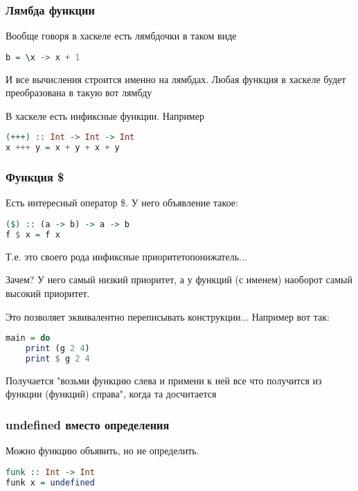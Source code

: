 \documentclass[10pt, a4paper]{article}
\begin{document}
\subsubsection{Лямбда функции}
Вообще говоря в хаскеле есть лямбдочки в таком виде

\begin{lstlisting}[language=haskell]
b = \x -> x + 1
\end{lstlisting}

И все вычисления строится именно на лямбдах. Любая функция в хаскеле будет преобразована в такую вот лямбду

В хаскеле есть инфиксные функции. Например

\begin{lstlisting}[language=haskell]
(+++) :: Int -> Int -> Int
x +++ y = x + y + x + y
\end{lstlisting} 

\subsubsection{Функция \$}
Есть интересный оператор \$. У него объявление такое:

\begin{lstlisting}[language=haskell]
($) :: (a -> b) -> a -> b
f $ x = f x
\end{lstlisting}
 
Т.е. это своего рода инфиксные приоритетопонижатель...

Зачем? У него самый низкий приоритет, а у функций (с именем) наоборот самый высокий приоритет.

Это позволяет эквивалентно переписывать конструкции... Например вот так:
\begin{lstlisting}[language=haskell]
main = do 
    print (g 2 4)
    print $ g 2 4
\end{lstlisting}

Получается "возьми функцию слева и примени к ней все что получится из функции (функций) справа", когда та досчитается


\subsubsection{undefined вместо определения}

Можно функцию объявить, но не определить.
\begin{lstlisting}[language=haskell]
funk :: Int -> Int
funk x = undefined
\end{lstlisting}
\end{document}

